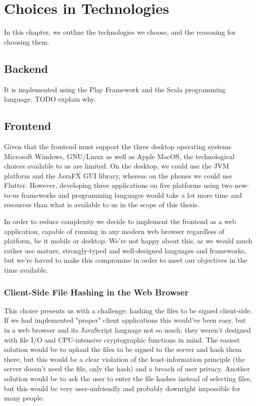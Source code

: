 \chapter*{Choices in Technologies}
\label{ch:techchoices}
In this chapter, we outline the technologies we choose, and the reasoning for choosing them.

\section{Backend}
\label{sec:techbackend}
It is implemented using the Play Framework\cite{playframework} and the Scala\cite{scalalang} programming language.
TODO explain why.

\section{Frontend}
\label{sec:techfrontend}

Given that the frontend must support the three desktop operating systems Microsoft Windows, GNU/Linux as well as Apple MacOS,
the technological choices available to us are limited.
On the desktop, we could use the \gls{JVM} platform and the JavaFX \gls{GUI} library, whereas on the phones
we could use Flutter\cite{flutterframework}.
However, developing three applications on five platforms using two new-to-us frameworks and programming languages
would take a lot more time and resources than what is available to us in the scope of this thesis.

In order to reduce complexity we decide to implement the frontend as a web application, capable of running
in any modern web browser regardless of platform, be it mobile or desktop.
We're not happy about this, as we would much rather use mature, strongly-typed and well-designed languages and frameworks,
but we're forced to make this compromise in order to meet our objectives in the time available.

\subsection{Client-Side File Hashing in the Web Browser}
\label{subsec:browserhashing}
This choice presents us with a challenge: hashing the files to be signed client-side.
If we had implemented "proper" client applications this would've been easy, but in a web browser and its
JavaScript language not so much: they weren't designed with file I/O and CPU-intensive cryptographic functions in mind.
The easiest solution would be to upload the files to be signed to the server and hash them there,
but this would be a clear violation of the least-information principle (the server doesn't need the file, only the hash)
and a breach of user privacy.
Another solution would be to ask the user to enter the file hashes instead of selecting files,
but this would be very user-unfriendly and probably downright impossible for many people.

